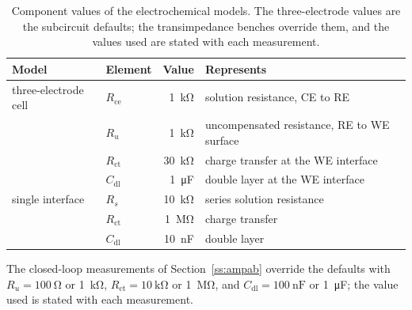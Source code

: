 \begin{table}[htbp]
  \centering
  \caption[{Component values of the electrochemical models.}]{Component values of
  the electrochemical models. The three-electrode values are the subcircuit
  defaults; the transimpedance benches override them, and the values used are
  stated with each measurement.}
  \label{tab:analog-models}
  \begin{tabular}{llrl}
    \toprule
    Model & Element & Value & Represents \\
    \midrule
    three-electrode cell      & $R_{\mathrm{ce}}$  & \SI{1}{\kilo\ohm}    & solution resistance, CE to RE \\
                                & $R_u$              & \SI{1}{\kilo\ohm}    & uncompensated resistance, RE to WE surface \\
                                & $R_{\mathrm{ct}}$  & \SI{30}{\kilo\ohm}   & charge transfer at the WE interface \\
                                & $C_{\mathrm{dl}}$  & \SI{1}{\micro\farad} & double layer at the WE interface \\
    \addlinespace
    single interface & $R_s$              & \SI{10}{\kilo\ohm}   & series solution resistance \\
                                & $R_{\mathrm{ct}}$  & \SI{1}{\mega\ohm}    & charge transfer \\
                                & $C_{\mathrm{dl}}$  & \SI{10}{\nano\farad} & double layer \\
    \bottomrule
  \end{tabular}
\end{table}

The closed-loop measurements of Section~\ref{ss:ampab} override the defaults with
$R_u = \SI{100}{\ohm}$ or \SI{1}{\kilo\ohm}, $R_{\mathrm{ct}} =
\SI{10}{\kilo\ohm}$ or \SI{1}{\mega\ohm}, and $C_{\mathrm{dl}} =
\SI{100}{\nano\farad}$ or \SI{1}{\micro\farad}; the value used is stated with
each measurement.
